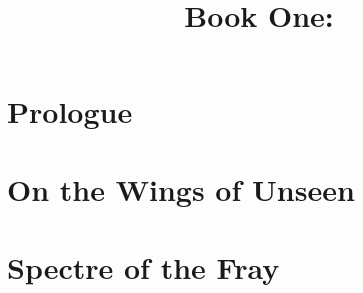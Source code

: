 \documentclass[a4paper,12pt,oneside]{book}
\title{%
  \SentinelsofMith
  \\
  Book One:
  \\
  \TwilightAngelRememberEmph
}
\begin{document}
  \stuffatthebeginning
  
  
  
  \begin{comment}
  \part{Front matter}
  \end{comment}
  
  
  
%   
%   
  
  
  \newpage
  
  
  
  
  
  
  \part{Prologue}
    
    
    
  
  \part{On the Wings of \Dragons Unseen}
    
    
    
    
    
    
    
    
    
    
  

  \part{Spectre of the Fray}
    
%     
%     
    
    
    
    
%     
%     
  
\end{document}
